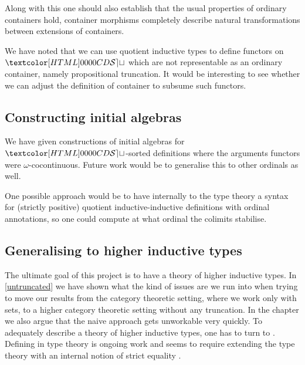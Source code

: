 Along with this one should also establish that the usual properties of
ordinary containers hold, \ie container morphisms completely describe
natural transformations between extensions of containers.

We have noted that we can use quotient inductive types to define
functors on $\SET$ which are not representable as an ordinary
container, namely propositional truncation. It would be interesting to
see whether we can adjust the definition of container to subsume such
functors.

\subsection{Constructing initial algebras}

We have given constructions of initial algebras for $\SET$-sorted
definitions where the arguments functors were
$\omega$-cocontinuous. Future work would be to generalise this to
other ordinals as well.

One possible approach would be to have internally to the type theory a
syntax for (strictly positive) quotient inductive-inductive
definitions with ordinal annotations, so one could compute at what
ordinal the colimits stabilise.

\subsection{Generalising to higher inductive types}

The ultimate goal of this project is to have a theory of higher
inductive types. In \cref{untruncated} we have shown what the kind of
issues are we run into when trying to move our results from the
category theoretic setting, where we work only with sets, to a higher
category theoretic setting without any truncation. In the chapter we
also argue that the naive approach gets unworkable very quickly. To
adequately describe a theory of higher inductive types, one has to
turn to \inftycats. Defining \inftycats in type theory is ongoing work
and seems to require extending the type theory with an internal notion
of strict equality \cite{Altenkirch2016,Altenkirch2016iii}.
